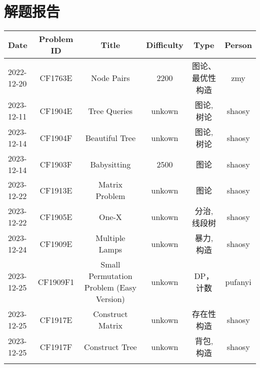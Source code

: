\chapter{解题报告}
\begin{center}
\begin{longtable}{l c c c c c }

Date & Problem ID & Title & Difficulty & Type & Person   \\ 
\hline
2022-12-20 & CF1763E & Node Pairs & 2200 & 图论、最优性构造 & zmy  \\
2023-12-11 & CF1904E & Tree Queries & unkown & 图论, 树论 & shaosy \\
2023-12-14 & CF1904F & Beautiful Tree & unkown & 图论, 树论 & shaosy \\
2023-12-14 & CF1903F & Babysitting & 2500 & 图论 & shaosy \\
2023-12-22 & CF1913E & Matrix Problem & unkown & 图论 & shaosy \\
2023-12-22 & CF1905E & One-X & unkown & 分治, 线段树 & shaosy \\
2023-12-24 & CF1909E & Multiple Lamps & unkown & 暴力, 构造 & shaosy \\
2023-12-25 & CF1909F1 & Small Permutation Problem (Easy Version) & unkown & DP，计数 & pufanyi \\
2023-12-25 & CF1917E & Construct Matrix & unkown & 存在性构造 & shaosy \\
2023-12-25 & CF1917F & Construct Tree & unkown & 背包, 构造 & shaosy \\
\hline

\label{tab:practice_index}
\end{longtable}
\end{center}


